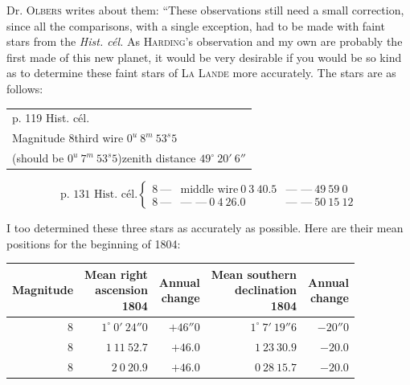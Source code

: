 Dr. \textsc{Olbers} writes about them: “These observations still need a small correction, since all the comparisons, with a single exception, had to be made with faint stars from the \textit{Hist. cél.} As \textsc{Harding}’s observation and my own are probably the first made of this new planet, it would be very desirable if you would be so kind as to determine these faint stars of \textsc{La Lande} more accurately. The stars are as follows:

\begin{center}\fontsize{9}{11}\selectfont
\begin{tabular}{l}
p. 119 Hist. cél.\\
Magnitude $8$\quad third wire $0^u\ 8^m\ 53^s5$\\
\quad (should be $0^u\ 7^m\ 53^s5$)\quad zenith distance $49^\circ\ 20'\ 6''$
\end{tabular}
\[
\text{p. 131 Hist. cél.}\left\{\begin{array}{lll}
8\ \text{—}&\text{middle wire}\ 0\ 3\ 40.5&\text{— —}\ 49\ 59\ 0\\
8\ \text{—}&\text{— —}\ 0\ 4\ 26.0&\text{— —}\ 50\ 15\ 12
\end{array}\right.
\]
\end{center}
\par
{}%
\indent I too determined these three stars as accurately as possible. Here are their mean positions for the beginning of 1804:

\begin{center}
\begingroup\fontsize{8}{10}\selectfont\setlength{\tabcolsep}{3pt}\renewcommand{\arraystretch}{1.12}
\begin{tabular}{r|r|r|r|r}
Magnitude & \shortstack{Mean right\\ascension\\1804} & \shortstack{Annual\\change} & \shortstack{Mean southern\\declination\\1804} & \shortstack{Annual\\change} \\ \hline
$8$ & $1^\circ\ 0'\ 24''0$ & $+46''0$ & $1^\circ\ 7'\ 19''6$ & $-20''0$ \\
$8$ & $1\ 11\ 52.7$ & $+46.0$ & $1\ 23\ 30.9$ & $-20.0$ \\
$8$ & $2\ 0\ 20.9$ & $+46.0$ & $0\ 28\ 15.7$ & $-20.0$ \\
\end{tabular}\endgroup
\end{center}

